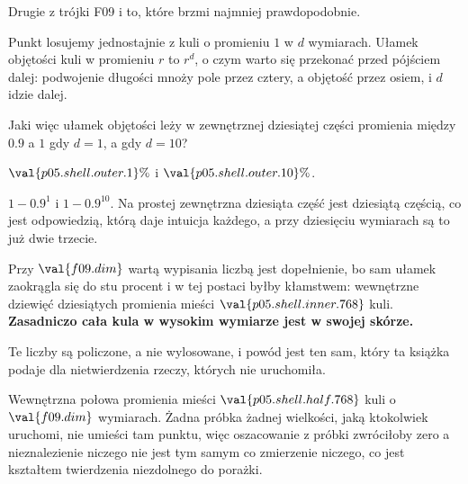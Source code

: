 \begin{fr}
Drugie z trójki F09 i to, które brzmi najmniej prawdopodobnie.

Punkt losujemy jednostajnie z kuli o promieniu $1$ w $d$ wymiarach. Ułamek
objętości kuli w promieniu $r$ to $r^{d}$, o czym warto się przekonać przed
pójściem dalej: podwojenie długości mnoży pole przez cztery, a objętość przez
osiem, i $d$ idzie dalej.

Jaki więc ułamek objętości leży w zewnętrznej dziesiątej części promienia
\dash{} między $\num{0.9}$ a $1$ \dash{} gdy $d = 1$, a gdy $d = 10$?
\dotline
\nextframe
\end{fr}

\begin{fr}
\begin{ansblock}
$\val{p05.shell.outer.1}\%$ i $\val{p05.shell.outer.10}\%$.
\end{ansblock}

$1 - \num{0.9}^{1}$ i $1 - \num{0.9}^{10}$. Na prostej zewnętrzna dziesiąta część jest
dziesiątą częścią, co jest odpowiedzią, którą daje intuicja każdego, a przy
dziesięciu wymiarach są to już dwie trzecie.

Przy $\val{f09.dim}$ wartą wypisania liczbą jest dopełnienie, bo sam ułamek
zaokrągla się do stu procent i w tej postaci byłby kłamstwem: wewnętrzne
dziewięć dziesiątych promienia mieści $\val{p05.shell.inner.768}$ kuli.
\textbf{Zasadniczo cała kula w wysokim wymiarze jest w swojej skórze.}
\end{fr}

\begin{fr}
\begin{note}
Te liczby są policzone, a nie wylosowane, i powód jest ten sam, który ta
książka podaje dla nietwierdzenia rzeczy, których nie uruchomiła.

Wewnętrzna połowa promienia mieści $\val{p05.shell.half.768}$ kuli o
$\val{f09.dim}$ wymiarach. Żadna próbka żadnej wielkości, jaką ktokolwiek
uruchomi, nie umieści tam punktu, więc oszacowanie z próbki zwróciłoby zero
\dash{} a nieznalezienie niczego nie jest tym samym co zmierzenie niczego, co
jest kształtem twierdzenia niezdolnego do porażki.
\end{note}
\end{fr}

